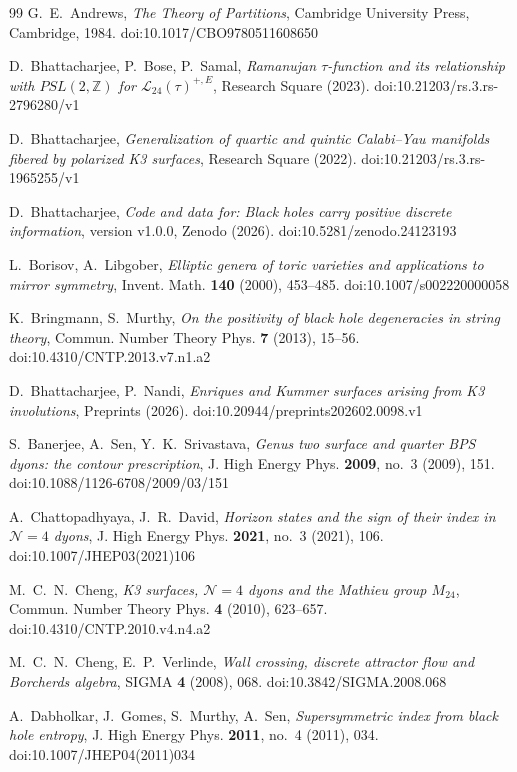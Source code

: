 \documentclass[11pt]{amsart}
\theoremstyle{definition}
\newcommand{\zenodoDOI}{10.5281/zenodo.24123193}
\begin{document}
\begingroup\raggedright
\begin{thebibliography}{99}
 G.~E.~Andrews, \emph{The Theory of Partitions}, Cambridge University Press, Cambridge, 1984. doi:10.1017/CBO9780511608650

 D.~Bhattacharjee, P.~Bose, P.~Samal, \emph{Ramanujan $\tau$-function and its relationship with $PSL(2,\mathbb Z)$ for $\mathcal L_{24}(\tau)^{+,E}$}, Research Square (2023). doi:10.21203/rs.3.rs-2796280/v1

 D.~Bhattacharjee, \emph{Generalization of quartic and quintic Calabi--Yau manifolds fibered by polarized K3 surfaces}, Research Square (2022). doi:10.21203/rs.3.rs-1965255/v1

 D.~Bhattacharjee, \emph{Code and data for: Black holes carry positive discrete information}, version v1.0.0, Zenodo (2026). doi:\zenodoDOI

 L.~Borisov, A.~Libgober, \emph{Elliptic genera of toric varieties and applications to mirror symmetry}, Invent. Math. \textbf{140} (2000), 453--485. doi:10.1007/s002220000058

 K.~Bringmann, S.~Murthy, \emph{On the positivity of black hole degeneracies in string theory}, Commun. Number Theory Phys. \textbf{7} (2013), 15--56. doi:10.4310/CNTP.2013.v7.n1.a2

 D.~Bhattacharjee, P.~Nandi, \emph{Enriques and Kummer surfaces arising from K3 involutions}, Preprints (2026). doi:10.20944/preprints202602.0098.v1

 S.~Banerjee, A.~Sen, Y.~K.~Srivastava, \emph{Genus two surface and quarter BPS dyons: the contour prescription}, J. High Energy Phys. \textbf{2009}, no.~3 (2009), 151. doi:10.1088/1126-6708/2009/03/151

 A.~Chattopadhyaya, J.~R.~David, \emph{Horizon states and the sign of their index in $\mathcal N=4$ dyons}, J. High Energy Phys. \textbf{2021}, no.~3 (2021), 106. doi:10.1007/JHEP03(2021)106

 M.~C.~N.~Cheng, \emph{K3 surfaces, $\mathcal N=4$ dyons and the Mathieu group $M_{24}$}, Commun. Number Theory Phys. \textbf{4} (2010), 623--657. doi:10.4310/CNTP.2010.v4.n4.a2

 M.~C.~N.~Cheng, E.~P.~Verlinde, \emph{Wall crossing, discrete attractor flow and Borcherds algebra}, SIGMA \textbf{4} (2008), 068. doi:10.3842/SIGMA.2008.068

 A.~Dabholkar, J.~Gomes, S.~Murthy, A.~Sen, \emph{Supersymmetric index from black hole entropy}, J. High Energy Phys. \textbf{2011}, no.~4 (2011), 034. doi:10.1007/JHEP04(2011)034


\end{thebibliography}
\end{document}
